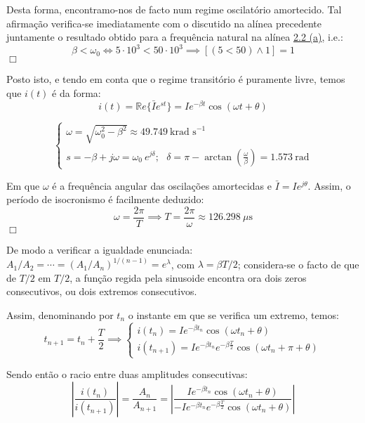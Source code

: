 Desta forma, encontramo-nos de facto num regime oscilatório amortecido. Tal afirmação verifica-se imediatamente com o discutido na alínea precedente juntamente o resultado obtido para a frequência natural na alínea \hyperref[subsubsec_a2]{\underline{2.2} (a)}, i.e.:
$$
    \beta < \omega_0 \iff 5\cdot 10^3 < 50\cdot 10^3 \implies [(5 < 50) \land 1] = 1 
$$
\hfill \ensuremath{\Box}

Posto isto, e tendo em conta que o regime transitório é puramente livre, temos que $i(t)$ é da forma:
\begin{equation}
    \label{eq2}
    i(t) = \mathbb{R}e\{\bar{I} e^{st} \} = Ie^{-\beta t}\cos{(\omega t + \theta)}
\end{equation}

$$
    \begin{cases}
        \omega = \sqrt{\omega_0^2 - \beta^2} \approx 49.749\ \text{krad s}^{-1} \\
        s = -\beta + j\omega = \omega_0\ e^{j\delta};\ \ \ \delta = \pi - \arctan{\left(\frac{\omega}{\beta}\right)} = 1.573\ \text{rad}
    \end{cases}
$$

Em que $\omega$ é a frequência angular das oscilações amortecidas e $\bar{I} = Ie^{j\theta}$. Assim, o período de isocronismo é facilmente deduzido:
$$
    \omega = \frac{2\pi}{T} \implies T = \frac{2\pi}{\omega} \approx 126.298\ \mu\text{s}
$$
\hfill \ensuremath{\Box}

De modo a verificar a igualdade enunciada: $A_1/A_2 = \cdots = (A_1/A_n)^{1/(n-1)} = e^{\lambda}$, com $\lambda = \beta T/2$; considera-se o facto de que de $T/2$ em $T/2$, a função regida pela sinusoide encontra ora dois zeros consecutivos, ou dois extremos consecutivos. 

Assim, denominando por $t_n$ o instante em que se verifica um extremo, temos:
$$
    t_{n+1} = t_n + \frac{T}{2} \implies
    \begin{cases}
        i(t_n) = Ie^{-\beta t_n}\cos{(\omega t_n + \theta)}\\
        i(t_{n+1}) = Ie^{-\beta t_n}e^{-\beta \frac{T}{2}}\cos{(\omega t_n + \pi + \theta)}
    \end{cases}
$$

\clearpage
Sendo então o racio entre duas amplitudes consecutivas:
$$
    \left\vert \frac{i(t_{n})}{i(t_{n+1})} \right\vert = \frac{A_{n}}{A_{n+1}} = \left\vert \frac{Ie^{-\beta t_n}\cos{(\omega t_n + \theta)}}{-Ie^{-\beta t_n}e^{-\beta \frac{T}{2}}\cos{(\omega t_n + \theta)}} \right\vert
$$

